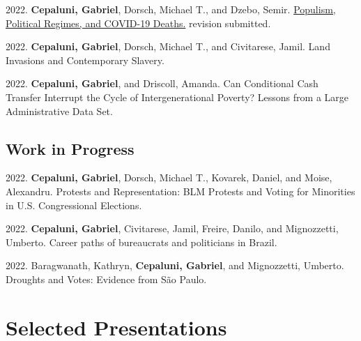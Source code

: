 \documentclass[a4paper,11.5pt]{article}
\renewenvironment{itemize}{
	\begin{list}{}{
			\setlength{\leftmargin}{1.5em}
		}
		}{
	\end{list}
}
\begin{document}
\begin{itemize}
	
	\item 2022. \textbf{Cepaluni, Gabriel}, Dorsch, Michael T., and Dzebo, Semir. \href{https://papers.ssrn.com/sol3/papers.cfm?abstract_id=3816398}{Populism, Political Regimes, and COVID-19 Deaths.} revision submitted.
	
	\item 2022. \textbf{Cepaluni, Gabriel}, Dorsch, Michael T., and Civitarese, Jamil. Land Invasions and Contemporary Slavery.
	
	\item 2022. \textbf{Cepaluni, Gabriel}, and Driscoll, Amanda. Can Conditional Cash Transfer Interrupt the Cycle of Intergenerational Poverty? Lessons from a Large Administrative Data Set.
	
\end{itemize}

\subsection*{Work in Progress}

\begin{itemize}
	\item 2022. \textbf{Cepaluni, Gabriel}, Dorsch, Michael T., Kovarek, Daniel, and Moise, Alexandru. Protests and Representation: BLM Protests and Voting for Minorities in U.S. Congressional Elections.
	\item 2022. \textbf{Cepaluni, Gabriel}, Civitarese, Jamil, Freire, Danilo, and Mignozzetti, Umberto. Career paths of bureaucrats and politicians in Brazil.
	\item 2022. Baragwanath, Kathryn, \textbf{Cepaluni, Gabriel}, and Mignozzetti, Umberto. Droughts and Votes: Evidence from São Paulo.
\end{itemize}

\section*{Selected Presentations}
\end{document}
